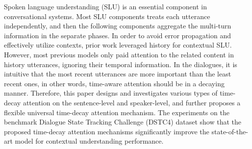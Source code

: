 Spoken language understanding (SLU) is an essential component in conversational systems. Most SLU components treats each utterance independently, and then the following components aggregate the multi-turn information in the separate phases. In order to avoid error propagation and effectively utilize contexts, prior work leveraged history for contextual SLU. However, most previous models only paid attention to the related content in history utterances, ignoring their temporal information. In the dialogues, it is intuitive that the most recent utterances are more important than the least recent ones, in other words, time-aware attention should be in a decaying manner. Therefore, this paper designs and investigates various types of time-decay attention on the sentence-level and speaker-level, and further proposes a flexible universal time-decay attention mechanism. The experiments on the benchmark Dialogue State Tracking Challenge (DSTC4) dataset show that the proposed time-decay attention mechanisms significantly improve the state-of-the-art model for contextual understanding performance.
